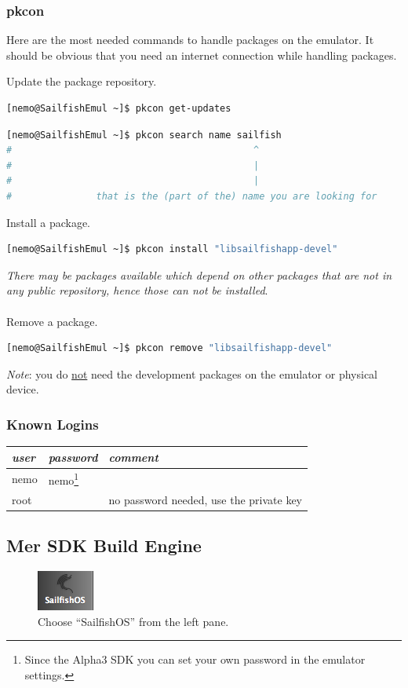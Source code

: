 \subsubsection{pkcon}\label{subsubsec:pkcon}
%
Here are the most needed commands to handle packages on the emulator. It should be obvious that you need an internet connection while handling packages.

Update the package repository.
\begin{lstlisting}[language=bash]
[nemo@SailfishEmul ~]$ pkcon get-updates
\end{lstlisting}
%
\begin{lstlisting}[language=bash]
[nemo@SailfishEmul ~]$ pkcon search name sailfish
#                                           ^
#                                           |
#                                           |
#               that is the (part of the) name you are looking for
\end{lstlisting}
%
Install a package.
\begin{lstlisting}[language=bash]
[nemo@SailfishEmul ~]$ pkcon install "libsailfishapp-devel"
\end{lstlisting}
\emph{There may be packages available which depend on other packages that are not in any public repository, hence those can not be installed}.
\\
\\
Remove a package.
\begin{lstlisting}[language=bash]
[nemo@SailfishEmul ~]$ pkcon remove "libsailfishapp-devel"
\end{lstlisting}
%
\emph{Note}: you do \underline{not} need the development packages on the emulator or physical device.
%
\subsubsection{Known Logins}\label{subsubsec:emulatorlogins}
%
\begin{tabular}{lll}
  \emph{user} & \emph{password} & \emph{comment} \\
  \hline 
  nemo & nemo\footnote{Since the Alpha3 SDK you can set your own password in the emulator settings.} &  \\
  root &  & no password needed, use the private key \\
\end{tabular}
%
%
\subsection{Mer SDK Build Engine}\label{subsec:mersdkpkg}
%
\begin{figure}[H]
  \centering
  \includegraphics[scale=0.4]{../media/gfx/QtCreator/MerSDKsettings.png} 
  \caption{Choose ``SailfishOS'' from the left pane.}
  \label{fig:mersdkpkg:sailfishos}
\end{figure}
%
